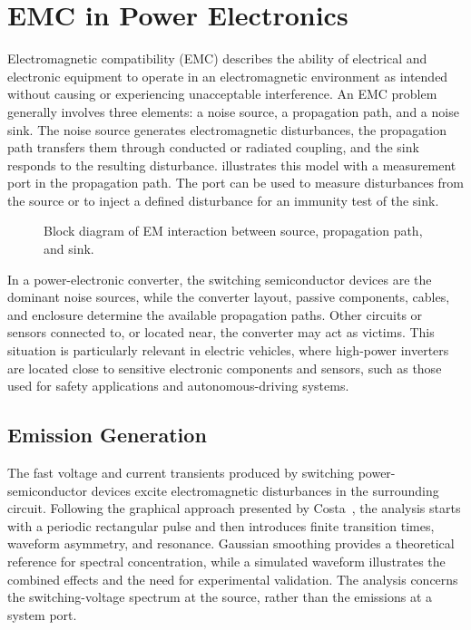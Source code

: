 \section{EMC in Power Electronics}

Electromagnetic compatibility (EMC) describes the ability of electrical and electronic equipment to operate in an electromagnetic environment as intended without causing or experiencing unacceptable interference. 
An EMC problem generally involves three elements: a noise source, a propagation path, and a noise sink. 
The noise source generates electromagnetic disturbances, the propagation path transfers them through conducted or radiated coupling, and the sink responds to the resulting disturbance. 
 illustrates this model with a measurement port in the propagation path.
The port can be used to measure disturbances from the source or to inject a defined disturbance for an immunity test of the sink.
\begin{figure}
	\caption{Block diagram of EM interaction between source, propagation path, and sink.}
	\label{fig:BlockDiagram_SourceVictim}
\end{figure}

In a power-electronic converter, the switching semiconductor devices are the dominant noise sources, while the converter layout, passive components, cables, and enclosure determine the available propagation paths. 
Other circuits or sensors connected to, or located near, the converter may act as victims.
This situation is particularly relevant in electric vehicles, where high-power inverters are located close to sensitive electronic components and sensors, such as those used for safety applications and autonomous-driving systems.

\FloatBarrier

\subsection{Emission Generation}
\label{sec:Fundamental_Generation}
The fast voltage and current transients produced by switching power-semiconductor devices excite electromagnetic disturbances in the surrounding circuit.
Following the graphical approach presented by Costa~\cite{costa_graphical_2005}, the analysis starts with a periodic rectangular pulse and then introduces finite transition times, waveform asymmetry, and resonance.
Gaussian smoothing provides a theoretical reference for spectral concentration, while a simulated waveform illustrates the combined effects and the need for experimental validation.
The analysis concerns the switching-voltage spectrum at the source, rather than the emissions at a system port.

